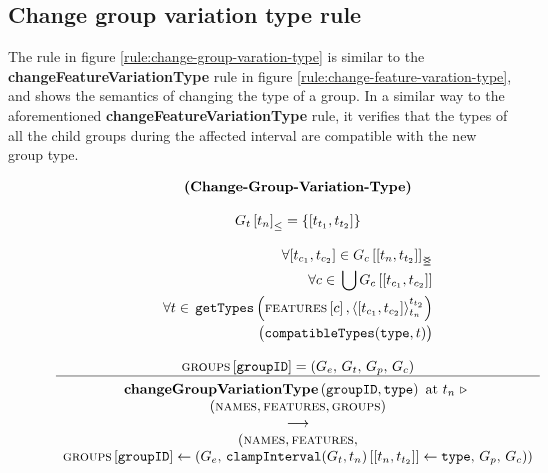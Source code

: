 \subsection{Change group variation type rule}
\label{sub:change-group-variation-type-rule}
The rule in figure \vref{rule:change-group-varation-type} is similar to the \textbf{changeFeatureVariationType} rule in figure \vref{rule:change-feature-varation-type}, and shows the semantics of changing the type of a group. In a similar way to the aforementioned \textbf{changeFeatureVariationType} rule, it verifies that the types of all the child groups during the affected interval are compatible with the new group type.

\begin{figure}
    \renewcommand{\arraystretch}{1.1}
    \sossize$$\begin{array}{c}
      \ntyperule{Change-Group-Variation-Type}
      {\\
        \containing{G_t}{t_n} = \set{\interval{t_{t_1}}{t_{t_2}}} %
        \\
        \\
        \begin{split}
        \forall \interval{t_{c_1}}{t_{c_2}} \in \overlapping{G_c}{t_n}{t_{t_2}}\\ %
        \forall c \in \, \bigcup \lookup{G_c}{\interval{t_{c_1}}{t_{c_2}}}\\ %
        \forall t \in \, \var{getTypes}\left(\lookup{\features}{c}, \clamp{\interval{t_{c_1}}{t_{c_2}}}{t_n}{t_{t_2}}\right) \\ %
        \big(\var{compatibleTypes}(\var{type}, t)\big)
      \end{split}\\
         \\

        \lookup{\groups{}}{\var{groupID}} = \group
      }
      {
        \textbf{changeGroupVariationType}\left( \var{groupID}, \var{type}\right) \text{ at } t_n \shove \\
        (\names{}, \features{}, \groups{}) \\
        \transition \\
        (\names{}, \features{}, \\
        \lookup{\groups{}}{\var{groupID}} \assign \left( G_e,\, \lookup{\var{clampInterval}(G_t, t_n)}{\interval{t_n}{t_{t_2}}} \assign \var{type},\, G_p,\, G_c \right))
      }
    \end{array}$$
  \caption{\label{rule:change-group-varation-type}}
\end{figure}

